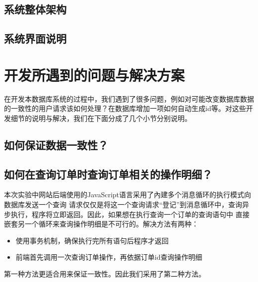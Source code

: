 \documentclass{myreport}
\begin{document}
\section{系统整体架构}


\section{系统界面说明}



\chapter{开发所遇到的问题与解决方案}


在开发本数据库系统的过程中，我们遇到了很多问题，例如对可能改变数据库数据的一致性的用户请求该如何处理？在数据库增加一项如何自动生成id等。对这些开发细节的说明与解决，我们在下面分成了几个小节分别说明。

\section{如何保证数据一致性？}

\section{如何在查询订单时查询订单相关的操作明细？}
本次实验中网站后端使用的JavaScript语言采用了內建多个消息循环的执行模式向数据库发送一个查询
请求仅仅是将这一个查询请求“登记”到消息循环中，查询异步执行，程序将立即返回。因此，如果想在执行查询一个订单的查询语句中
直接嵌套另一个循环来查询操作明细是不可行的。解决方法有两种：
\begin{itemize}
    \item 使用事务机制，确保执行完所有语句后程序才返回
    \item 前端首先调用一次查询订单操作，再依据订单id查询操作明细
\end{itemize}
第一种方法更适合用来保证一致性。因此我们采用了第二种方法。

\end{document}
